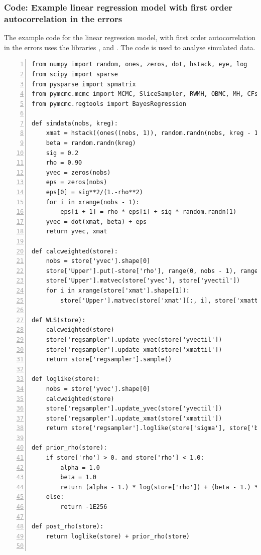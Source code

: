 \documentclass[article]{jss}
\begin{document}
\subsubsection{Code: Example linear regression model with first order
  autocorrelation in the errors}

The example code for the linear regression model, with first order
autocorrelation in the errors uses the  libraries
,  and . The code is used to
analyse simulated data.


\begin{lstlisting}[basicstyle={\scriptsize},numbers=left,tabsize=4]
from numpy import random, ones, zeros, dot, hstack, eye, log
from scipy import sparse
from pysparse import spmatrix
from pymcmc.mcmc import MCMC, SliceSampler, RWMH, OBMC, MH, CFsampler
from pymcmc.regtools import BayesRegression 

def simdata(nobs, kreg):
    xmat = hstack((ones((nobs, 1)), random.randn(nobs, kreg - 1)))
    beta = random.randn(kreg)
    sig = 0.2
    rho = 0.90
    yvec = zeros(nobs)
    eps = zeros(nobs)
    eps[0] = sig**2/(1.-rho**2)
    for i in xrange(nobs - 1):
        eps[i + 1] = rho * eps[i] + sig * random.randn(1)
    yvec = dot(xmat, beta) + eps
    return yvec, xmat

def calcweighted(store):
    nobs = store['yvec'].shape[0]
    store['Upper'].put(-store['rho'], range(0, nobs - 1), range(1, nobs))
    store['Upper'].matvec(store['yvec'], store['yvectil'])
    for i in xrange(store['xmat'].shape[1]):
        store['Upper'].matvec(store['xmat'][:, i], store['xmattil'][:, i])

def WLS(store):
    calcweighted(store)
    store['regsampler'].update_yvec(store['yvectil'])
    store['regsampler'].update_xmat(store['xmattil'])
    return store['regsampler'].sample()

def loglike(store):
    nobs = store['yvec'].shape[0]
    calcweighted(store)
    store['regsampler'].update_yvec(store['yvectil'])
    store['regsampler'].update_xmat(store['xmattil'])
    return store['regsampler'].loglike(store['sigma'], store['beta'])

def prior_rho(store):
    if store['rho'] > 0. and store['rho'] < 1.0:
        alpha = 1.0
        beta = 1.0
        return (alpha - 1.) * log(store['rho']) + (beta - 1.) * log(1.-store['rho'])
    else:
        return -1E256

def post_rho(store):
    return loglike(store) + prior_rho(store)


\end{lstlisting}
\end{document}
